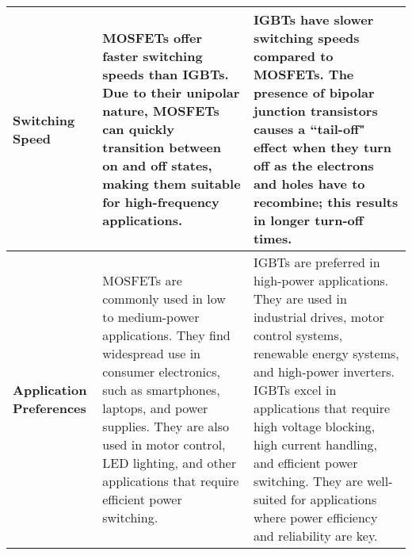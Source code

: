 \begin{table}[tbh!]
{\begin{tabular}{|p{2.1cm}|p{8cm}|p{8cm}|}
\textbf{Switching Speed} & MOSFETs offer faster switching speeds than IGBTs. Due to their unipolar nature, MOSFETs can quickly transition between on and off states, making them suitable for high-frequency applications. & IGBTs have slower switching speeds compared to MOSFETs. The presence of bipolar junction transistors causes a ``tail-off" effect when they turn off as the electrons and holes have to recombine; this results in longer turn-off times. \\ \hline
\textbf{Application Preferences} & MOSFETs are commonly used in low to medium-power applications. They find widespread use in consumer electronics, such as smartphones, laptops, and power supplies. They are also used in motor control, LED lighting, and other applications that require efficient power switching. & IGBTs are preferred in high-power applications. They are used in industrial drives, motor control systems, renewable energy systems, and high-power inverters. IGBTs excel in applications that require high voltage blocking, high current handling, and efficient power switching. They are well-suited for applications where power efficiency and reliability are key. \\ \hline
\end{tabular}%
}
\end{table}